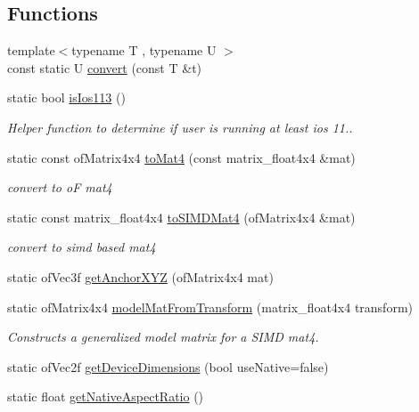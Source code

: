 \subsection*{Functions}
\begin{DoxyCompactItemize}
\item 
{\footnotesize template$<$typename T , typename U $>$ }\\const static U \mbox{\hyperlink{namespace_a_r_common_ab67b42b84c068f0c4ab2401ea3af86c6}{convert}} (const T \&t)
\item 
static bool \mbox{\hyperlink{namespace_a_r_common_a7939654fc3c2d04150e4cbf6953429d9}{is\+Ios113}} ()
\begin{DoxyCompactList}\small\item\em Helper function to determine if user is running at least ios 11.. \end{DoxyCompactList}\item 
static const of\+Matrix4x4 \mbox{\hyperlink{namespace_a_r_common_a4c4194125c19eb18f43b61b991261dbf}{to\+Mat4}} (const matrix\+\_\+float4x4 \&mat)
\begin{DoxyCompactList}\small\item\em convert to oF mat4 \end{DoxyCompactList}\item 
static const matrix\+\_\+float4x4 \mbox{\hyperlink{namespace_a_r_common_a94f59f549eb5aec3f077b54ae5e5df86}{to\+S\+I\+M\+D\+Mat4}} (of\+Matrix4x4 \&mat)
\begin{DoxyCompactList}\small\item\em convert to simd based mat4 \end{DoxyCompactList}\item 
static of\+Vec3f \mbox{\hyperlink{namespace_a_r_common_a5a232f6315a3a5b74678034efadd5d20}{get\+Anchor\+X\+YZ}} (of\+Matrix4x4 mat)
\item 
static of\+Matrix4x4 \mbox{\hyperlink{namespace_a_r_common_aec58705c71590506c5f1f86e927f11e1}{model\+Mat\+From\+Transform}} (matrix\+\_\+float4x4 transform)
\begin{DoxyCompactList}\small\item\em Constructs a generalized model matrix for a S\+I\+MD mat4. \end{DoxyCompactList}\item 
static of\+Vec2f \mbox{\hyperlink{namespace_a_r_common_a37407572659749170d1906046fa1921c}{get\+Device\+Dimensions}} (bool use\+Native=false)
\item 
static float \mbox{\hyperlink{namespace_a_r_common_a00f3449531f154cba4a751128117052f}{get\+Native\+Aspect\+Ratio}} ()

\end{DoxyCompactItemize}
